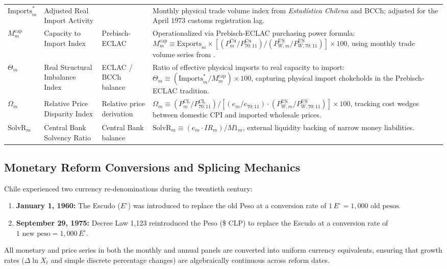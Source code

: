 \begin{table}[htbp]
\begin{tabularx}{\textwidth}{p{2.2cm}p{3.0cm}p{2.6cm}X}
$\text{Imports}^*_m$ & Adjusted Real Import Activity & \citet{DiazBahamonde2023} & Monthly physical trade volume index from \textit{Estadística Chilena} and BCCh; adjusted for the April 1973 customs registration lag. \\
$M^{\text{cap}}_m$ & Capacity to Import Index & Prebisch-ECLAC & Operationalized via Prebisch-ECLAC purchasing power formula: $M^{\text{cap}}_m \equiv \text{Exports}_m \times [(P^{\text{Cu}}_m / P^{\text{Cu}}_{70:11}) / (P^{\text{US}}_{W,m} / P^{\text{US}}_{W,70:11})] \times 100$, using monthly trade volume series from \citet{DiazBahamonde2023}. \\
$\Theta_m$ & Real Structural Imbalance Index & ECLAC / BCCh balance & Ratio of effective physical imports to real capacity to import: $\Theta_m \equiv (\text{Imports}^*_m / M^{\text{cap}}_m) \times 100$, capturing physical import chokeholds in the Prebisch-ECLAC tradition. \\
$\Omega_m$ & Relative Price Disparity Index & Relative price derivation & $\Omega_m \equiv (P^{\text{CL}}_m / P^{\text{CL}}_{70:11}) / [(e_m / e_{70:11}) \cdot (P^{\text{US}}_{W,m} / P^{\text{US}}_{W,70:11})] \times 100$, tracking cost wedges between domestic CPI and imported wholesale prices. \\
$\text{SolvR}_m$ & Central Bank Solvency Ratio & Central Bank balance & $\text{SolvR}_m \equiv (e_m \cdot IR_m) / M1_m$, external liquidity backing of narrow money liabilities. \\
\bottomrule
\end{tabularx}
\end{table}

\subsection{Monetary Reform Conversions and Splicing Mechanics}
\label{app:monetary_reforms}

Chile experienced two currency re-denominations during the twentieth century:
\begin{enumerate}[leftmargin=2em]
	\item \textbf{January 1, 1960:} The Escudo ($E^\circ$) was introduced to replace the old Peso at a conversion rate of $1\,E^\circ = 1,000\text{ old pesos}$.
	\item \textbf{September 29, 1975:} Decree Law 1,123 reintroduced the Peso (\$ CLP) to replace the Escudo at a conversion rate of $1\text{ new peso} = 1,000\,E^\circ$.
\end{enumerate}
All monetary and price series in both the monthly and annual panels are converted into uniform currency equivalents, ensuring that growth rates ($\Delta \ln X_t$ and simple discrete percentage changes) are algebraically continuous across reform dates.
